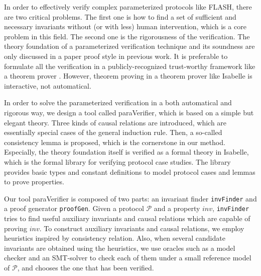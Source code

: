 \documentclass[final]{IEEEtran}
\newcommand\cai[1]{\textcolor{blue}{ #1} }
\begin{document}
In order to effectively verify complex parameterized protocols like FLASH, there are two critical problems. %
The first one is  how to find a set of sufficient and necessary invariants without (or with less) human intervention, which is a core problem in this field. %
The second one is the rigorousness  of the verification. The theory foundation of a parameterized verification technique and its soundness are only discussed in a paper proof style in previous work.  %
It is preferable to formulate all the verification in a publicly-recognized trust-worthy framework like a theorem prover \cite{Chou2004}. However,
 theorem proving in a theorem prover like Isabelle is   interactive, not automatical.


In order to solve the parameterized
verification %
 in a both automatical and rigorous way, we design a tool called {\sf paraVerifier}, which is based on a simple but elegant theory.  Three kinds of causal
relations are introduced, which are
essentially special cases of the general induction rule. Then, a
so-called consistency lemma is proposed, which is the cornerstone in
our method. Especially, the theory foundation itself is  verified as a
formal theory in Isabelle, which is the formal library for verifying protocol case studies. The library provides basic types and constant definitions to model protocol cases and lemmas to prove  properties. %

Our tool {\sf paraVerifier} is composed of two parts:  an invariant finder {\tt invFinder}
and a proof generator {\tt proofGen}. %
Given a protocol $\mathcal{P}$ and a property $inv$, {\tt invFinder} tries to find useful auxiliary invariants and causal relations which are capable of proving $inv$. To construct auxiliary invariants and causal relations, we employ heuristics inspired by consistency relation. Also, when several candidate invariants are obtained using the heuristics, we use oracles such as a model checker and an SMT-solver to check each of them under a small reference model of $\mathcal{P}$, and chooses the one that has been verified.
\end{document}
